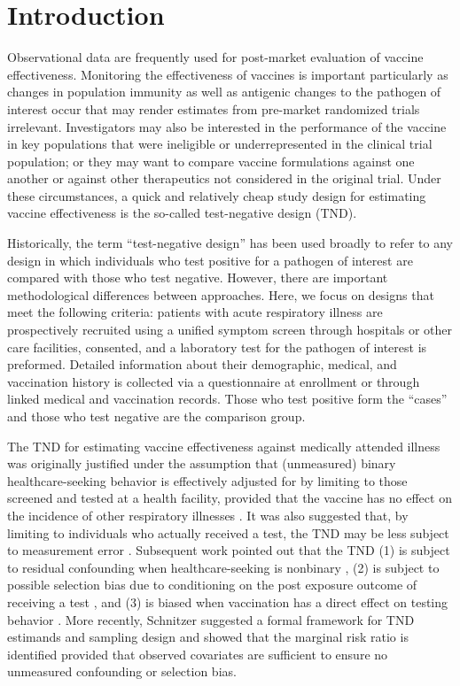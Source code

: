 \documentclass[11pt]{article}
\begin{document}
\section{Introduction} \label{sec:introduction}
Observational data are frequently used for post-market evaluation of vaccine effectiveness. Monitoring the effectiveness of vaccines is important particularly as changes in population immunity as well as antigenic changes to the pathogen of interest occur that may render estimates from pre-market randomized trials irrelevant. Investigators may also be interested in the performance of the vaccine in key populations that were ineligible or underrepresented in the clinical trial population; or they may want to compare vaccine formulations against one another or against other therapeutics not considered in the original trial. Under these circumstances, a quick and relatively cheap study design for estimating vaccine effectiveness is the so-called test-negative design (TND). 
 
Historically, the term ``test-negative design'' has been used broadly to refer to any design in which individuals who test positive for a pathogen of interest are compared with those who test negative. However, there are important methodological differences between approaches. Here, we focus on designs that meet the following criteria: patients with acute respiratory illness are prospectively recruited using a unified symptom screen through hospitals or other care facilities, consented, and a laboratory test for the pathogen of interest is preformed. Detailed information about their demographic, medical, and vaccination history is collected via a questionnaire at enrollment or through linked medical and vaccination records. Those who test positive form the ``cases'' and those who test negative are the comparison group. 

The TND for estimating vaccine effectiveness against medically attended illness was originally justified under the assumption that (unmeasured) binary healthcare-seeking behavior is effectively adjusted for by limiting to those screened and tested at a health facility, provided that the vaccine has no effect on the incidence of other respiratory illnesses \cite{jackson_test-negative_2013}. It was also suggested that, by limiting to individuals who actually received a test, the TND may be less subject to measurement error \cite{jackson_test-negative_2013}. Subsequent work pointed out that the TND (1) is subject to residual confounding when healthcare-seeking is nonbinary \cite{sullivan_theoretical_2016,lewnard_theoretical_2021}, (2) is subject to possible selection bias due to conditioning on the post exposure outcome of receiving a test \cite{sullivan_theoretical_2016}, and (3) is biased when vaccination has a direct effect on testing behavior \cite{foppa_case_2013}. More recently, Schnitzer \cite{schnitzer_estimands_2022} suggested a formal framework for TND estimands and sampling design and showed that the marginal risk ratio is identified provided that observed covariates are sufficient to ensure no unmeasured confounding or selection bias. 
\end{document}

